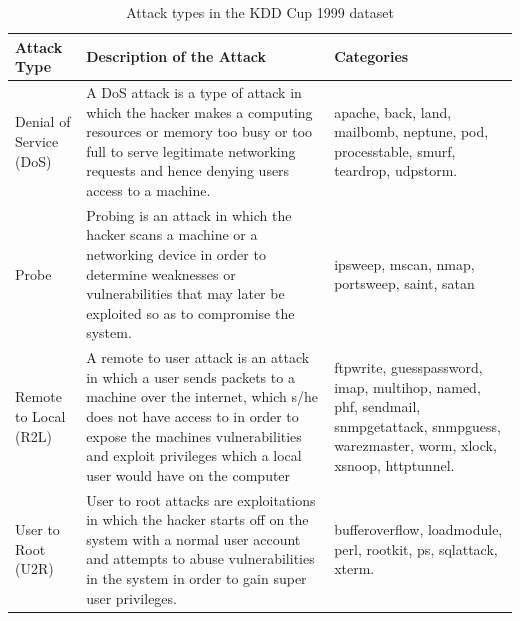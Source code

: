 \documentclass[runningheads]{llncs}
\newcommand{\otoprule}{\midrule[\heavyrulewidth]}
\begin{document}
  \begin{table}[t]
\centering
\caption{ Attack types in the KDD Cup 1999 dataset \cite{kdd1999} }
\label{table:KDD}
{\def\arraystretch{1.5}\tabcolsep=10pt
\begin{tabular}{p{2cm} p{4cm} p{3cm} }
\toprule
Attack Type 	& Description of the Attack &	Categories 	\\
\otoprule

Denial of Service (DoS)
 & {A DoS attack is a type of attack in which the hacker
makes a computing resources or memory too busy
or too full to serve legitimate networking requests
and hence denying users access to a machine.} &	{apache, back, land, mailbomb, neptune, pod,
processtable, smurf, teardrop, udpstorm.} \\
Probe & {Probing is an attack in which the hacker scans a
machine or a networking device in order to
determine weaknesses or vulnerabilities that may
later be exploited so as to compromise the system.}	& {ipsweep, mscan, nmap, portsweep, saint, satan}\\

Remote to Local (R2L) 
 & {A remote to user attack is an attack in which a user sends packets to a machine over the internet, which
s/he does not have access to in order to expose
the machines vulnerabilities and exploit privileges
which a local user would have on the computer} &	{ftpwrite, guesspassword, imap, multihop, named, phf, sendmail, snmpgetattack, snmpguess, warezmaster, worm, xlock, xsnoop, httptunnel.}\\

User to Root (U2R)  
 & {User to root attacks are exploitations in which the hacker starts off on the system with a normal user
account and attempts to abuse vulnerabilities in the system in order to gain super user privileges.} &	{bufferoverflow, loadmodule, perl, rootkit, ps, sqlattack, xterm.}\\


\bottomrule
\end{tabular}}
\end{table}
\end{document}
